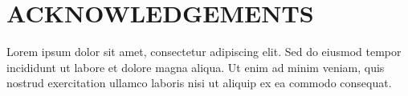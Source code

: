 


\chapter*{ACKNOWLEDGEMENTS}

Lorem ipsum dolor sit amet, consectetur adipiscing elit. Sed do eiusmod tempor incididunt ut labore et dolore magna aliqua. Ut enim ad minim veniam, quis nostrud exercitation ullamco laboris nisi ut aliquip ex ea commodo consequat.



